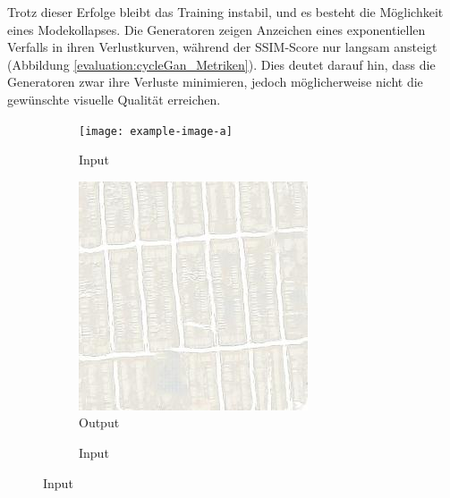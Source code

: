 Trotz dieser Erfolge bleibt das Training instabil, und es besteht die Möglichkeit eines Modekollapses. Die Generatoren zeigen Anzeichen eines exponentiellen Verfalls in ihren Verlustkurven, während der SSIM-Score nur langsam ansteigt (Abbildung \ref{evaluation:cycleGan_Metriken}). Dies deutet darauf hin, dass die Generatoren zwar ihre Verluste minimieren, jedoch möglicherweise nicht die gewünschte visuelle Qualität erreichen.\\

\begin{figure}
  \begin{subfigure}[t]{.2\textwidth}
    \caption{Input}
    \centering
    \texttt{[image: example-image-a]}
  \end{subfigure}
  \begin{subfigure}[t]{.2\textwidth}
    \caption{Output}
    \centering
    \includegraphics[width=\linewidth]{images/cycleGanResults/Maps10_Ld120_E100_Lr0002.jpg}
  \end{subfigure}
  \hfill
  \begin{subfigure}[t]{.2\textwidth}
    \caption{Input}
    \centering

\end{subfigure}
\end{figure}

